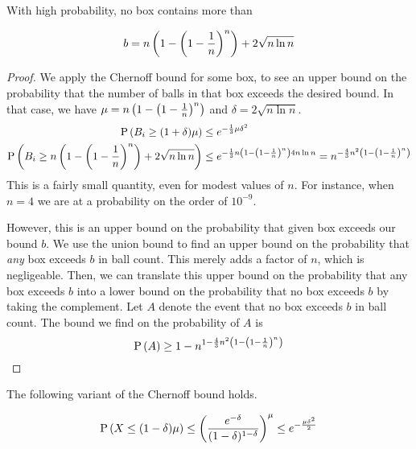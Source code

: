 \documentclass[11pt]{article}
\begin{document}
\begin{prop}
    With high probability, no box contains more than

    \begin{equation*}
        b = n \left( 1 - \left( 1 - \frac{1}{n} \right)^n \right) + 2 \sqrt{ n \ln n }
    \end{equation*}
\end{prop}

\begin{proof}
    We apply the Chernoff bound for some box, to see an upper bound on the
    probability that the number of balls in that box exceeds the desired bound.
    In that case, we have $\mu = n \left(1 - \left(1 - \frac{1}{n}\right)^n\right)$
    and $\delta = 2 \sqrt{n \ln n}$.
    \begin{align*}
        \operatorname{P}{\left(B_i \geq (1 + \delta) \mu\right)} &\leq e^{-\frac{1}{3} \mu \delta^2} \\
        \operatorname{P}{\left(B_i \geq n \left(1 - \left(1 - \frac{1}{n}\right)^n\right) + 2 \sqrt{n \ln n}\right)}
        &\leq e^{
            -\frac{1}{3}
            n \left(1 - \left(1 - \frac{1}{n}\right)^n\right)
            4 n \ln n
        }
        = n^{
            -\frac{4}{3} n^2 \left(1 - \left(1 - \frac{1}{n}\right)^n\right)
        }
    \end{align*}
    This is a fairly small quantity, even for modest values of $n$.
    For instance, when $n=4$ we are at a probability on the order of $10^{-9}$.

    However, this is an upper bound on the probability that given box exceeds
    our bound $b$.
    We use the union bound to find an upper bound on the probability that
    \emph{any} box exceeds $b$ in ball count. This merely adds a factor of $n$,
    which is negligeable.
    Then, we can translate this upper bound on the probability that any box
    exceeds $b$ into a lower bound on the probability that no box exceeds $b$
    by taking the complement.
    Let $A$ denote the event that no box exceeds $b$ in ball count.
    The bound we find on the probability of $A$ is
    \begin{equation*}
        \operatorname{P}{\left(A\right)} \geq 1 - n^{
            1 - \frac{4}{3} n^2 \left(1 - \left(1 - \frac{1}{n}\right)^n\right)
        }
    \end{equation*}
\end{proof}


\begin{prop}
    The following variant of the Chernoff bound holds.

    \begin{equation*}
        \operatorname{P}{\left(X \leq (1 - \delta)\mu\right)}
        \leq
        \left(
            \frac{
                e^{-\delta}
            }{
                (1 - \delta)^{1 - \delta}
            }
        \right)^\mu
        \leq
        e^{-\frac{\mu \delta^2}{2}}
    \end{equation*}
\end{prop}
\end{document}
